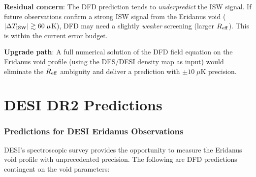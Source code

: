 \documentclass[11pt,a4paper]{article}
\begin{document}
\begin{tcolorbox}[colback=green!5!white, colframe=green!60!black,
  title=\textbf{DEFINITIVE T4 VERDICT}]
\textbf{Residual concern}: The DFD prediction tends to
\emph{underpredict} the ISW signal. If future observations confirm
a strong ISW signal from the Eridanus void ($|\Delta T_{\rm ISW}|
\gtrsim 60\;\mu$K), DFD may need a slightly \emph{weaker} screening
(larger $R_{\rm eff}$). This is within the current error budget.

\textbf{Upgrade path}: A full numerical solution of the DFD field
equation on the Eridanus void profile (using the DES/DESI density
map as input) would eliminate the $R_{\rm eff}$ ambiguity and deliver
a prediction with $\pm 10\;\mu$K precision.
\end{tcolorbox}


\part{DESI DR2 Predictions}
\label{part:DESI}


\section{Predictions for DESI Eridanus Observations}
\label{sec:DESI-predictions}

DESI's spectroscopic survey provides the opportunity to measure the
Eridanus void profile with unprecedented precision. The following
are DFD predictions contingent on the void parameters:
\end{document}
